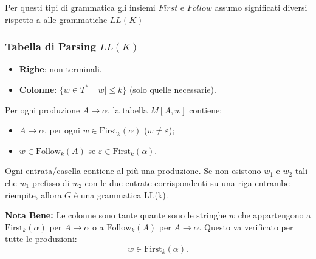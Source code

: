 Per questi tipi di grammatica gli insiemi $First \text{ e }Follow$ assumo significati diversi rispetto a alle grammatiche $LL(K)$

\subsubsection{Tabella di Parsing $LL(K)$}
\begin{itemize}
    \item \textbf{Righe}: non terminali.
    \item \textbf{Colonne}: $\{ w \in T^* \mid |w| \leq k \}$ (solo quelle necessarie).
\end{itemize}

\noindent Per ogni produzione $A \to \alpha$, la tabella $M[A, w]$ contiene:
\begin{itemize}
    \item $A \to \alpha$, per ogni $w \in \text{First}_k(\alpha)$ ($w \neq \varepsilon$);
    \item $w \in \text{Follow}_k(A)$ se $\varepsilon \in \text{First}_k(\alpha)$.
\end{itemize}

\noindent Ogni entrata/casella contiene al più una produzione. Se non esistono $w_1$ e $w_2$ tali che $w_1$ prefisso di $w_2$ con le due entrate corrispondenti su una riga entrambe riempite, allora $G$ è una grammatica LL(k).

\vspace{1em}
\noindent \textbf{Nota Bene:} 
Le colonne sono tante quante sono le stringhe $w$ che appartengono a $\text{First}_k(\alpha)$ per $A \to \alpha$ o a $\text{Follow}_k(A)$ per $A \to \alpha$. Questo va verificato per tutte le produzioni:
\[
w \in \text{First}_k(\alpha).
\]

